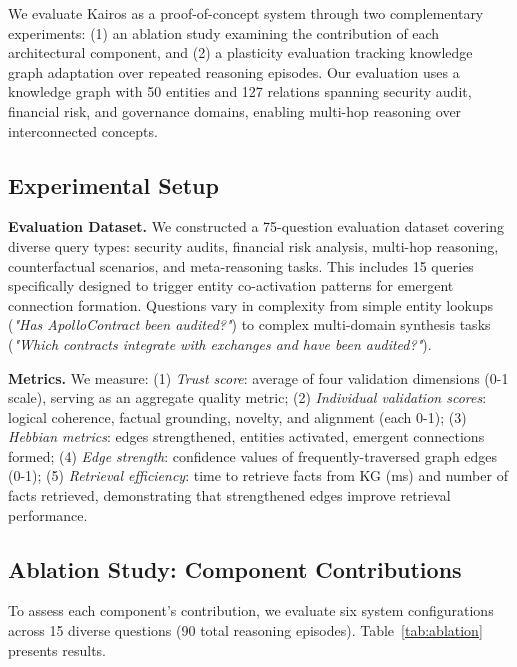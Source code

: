 \documentclass{article}
\begin{document}
We evaluate Kairos as a proof-of-concept system through two complementary experiments: (1) an ablation study examining the contribution of each architectural component, and (2) a plasticity evaluation tracking knowledge graph adaptation over repeated reasoning episodes. Our evaluation uses a knowledge graph with 50 entities and 127 relations spanning security audit, financial risk, and governance domains, enabling multi-hop reasoning over interconnected concepts.

\subsection{Experimental Setup}

\textbf{Evaluation Dataset.} We constructed a 75-question evaluation dataset covering diverse query types: security audits, financial risk analysis, multi-hop reasoning, counterfactual scenarios, and meta-reasoning tasks. This includes 15 queries specifically designed to trigger entity co-activation patterns for emergent connection formation. Questions vary in complexity from simple entity lookups (\textit{"Has ApolloContract been audited?"}) to complex multi-domain synthesis tasks (\textit{"Which contracts integrate with exchanges and have been audited?"}).

\textbf{Metrics.} We measure: (1) \textit{Trust score}: average of four validation dimensions (0-1 scale), serving as an aggregate quality metric; (2) \textit{Individual validation scores}: logical coherence, factual grounding, novelty, and alignment (each 0-1); (3) \textit{Hebbian metrics}: edges strengthened, entities activated, emergent connections formed; (4) \textit{Edge strength}: confidence values of frequently-traversed graph edges (0-1); (5) \textit{Retrieval efficiency}: time to retrieve facts from KG (ms) and number of facts retrieved, demonstrating that strengthened edges improve retrieval performance.

\subsection{Ablation Study: Component Contributions}

To assess each component's contribution, we evaluate six system configurations across 15 diverse questions (90 total reasoning episodes). Table~\ref{tab:ablation} presents results.
\end{document}
